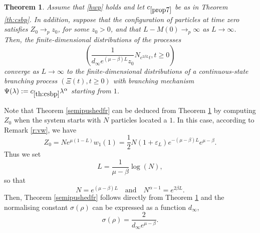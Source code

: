\documentclass[11pt]{article}
\theoremstyle{plain}
\newtheorem{theorem}[lemma]{Theorem}
\newtheorem{cor}[lemma]{Corollary}
\newcommand\vep{\varepsilon}
\begin{document}
% 
\begin{theorem}\label{ThNt} Assume that \eqref{hwp} holds and let $c_{\ref{prop7}}$ be as in Theorem \ref{th:csbp}.  In addition, suppose that the configuration of particles at time zero satisfies $Z_0\to_p z_0$, for some $z_0>0$,  and  that $L-M(0)\rightarrow_p\infty$ as $L\rightarrow \infty$. Then, the finite-dimensional distributions of the processes
\begin{equation*}
\left(\frac{1}{d_\infty e^{(\mu-\beta)L}z_0}N_{e^{2\beta L} t}, t\geqslant 0\right)
\end{equation*} converge as $L\rightarrow \infty$  to the finite-dimensional distributions of a continuous-state branching process $(\Xi(t),t\geqslant 0)$ with branching mechanism $\Psi(\lambda):=c_{\ref{th:csbp}}\lambda^\alpha$ starting from $1$.  
\end{theorem}
Note that Theorem \ref{semipushedfr} can be deduced from Theorem \ref{ThNt} by computing $Z_0$ when the system starts with $N$ particles located a $1$. In this case, according to Remark \ref{r:vw}, we have 
\begin{equation*}
Z_0=Ne^{\mu(1-L)}w_1(1)=\frac{1}{2}N(1+\vep_L)e^{-(\mu-\beta)L}e^{\mu-\beta}.
\end{equation*}
Thus we set 
$$L=\frac{1}{\mu-\beta}\log(N),$$
so that 
\begin{equation}
N=e^{(\mu-\beta)L} \quad  \text{and}\quad  N^{\alpha-1}=e^{2\beta L}.\label{eq:NL}
\end{equation}
Then, Theorem \ref{semipushedfr}  follows directly from Theorem \ref{ThNt} and the normalising constant $\sigma(\rho)$ can be expressed as a function $d_\infty$,
\begin{equation}
\sigma(\rho)=\frac{2}{d_\infty e^{\mu-\beta}}.\label{def:sigma}
\end{equation}


\end{document}
